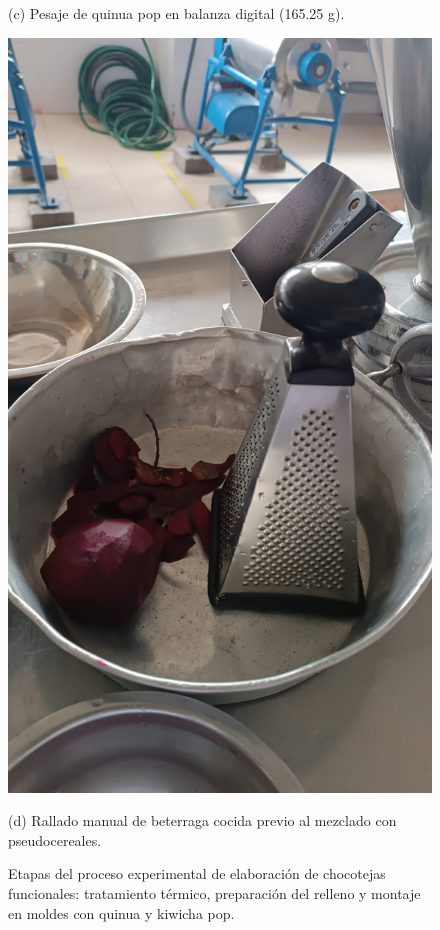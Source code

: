 \documentclass[manuscript,screen,review]{acmart}
\begin{document}
\begin{figure}[H]
\begin{minipage}{0.48\linewidth}
            \vspace{1mm}
            
            \small (c) Pesaje de quinua pop en balanza digital (165.25 g).
          \end{minipage}
          \hspace{1em}
          \begin{minipage}{0.48\linewidth}
            \centering
            \includegraphics[width=0.9\linewidth]{imagen/rallado.jpeg}
            
            \vspace{1mm}
            
            \small (d) Rallado manual de beterraga cocida previo al mezclado con pseudocereales.
          \end{minipage}
          
          \caption{Etapas del proceso experimental de elaboración de chocotejas funcionales: tratamiento térmico, preparación del relleno y montaje en moldes con quinua y kiwicha pop.}
          \label{fig:proceso_chocotejas}
        \end{figure}
\end{document}
